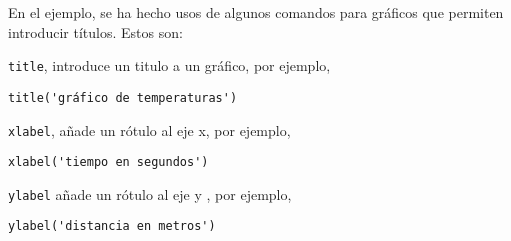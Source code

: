 










En el ejemplo, se ha hecho usos de algunos comandos para gráficos que permiten introducir títulos. Estos son: 

\texttt{title}, introduce un titulo a un gráfico, por ejemplo,
\begin{verbatim}
title('gráfico de temperaturas')
\end{verbatim}

\texttt{xlabel}, añade un rótulo al eje x, por ejemplo,

\begin{verbatim}
xlabel('tiempo en segundos')
\end{verbatim}

\texttt{ylabel} añade un rótulo al eje y , por ejemplo,
\begin{verbatim}
ylabel('distancia en metros')
\end{verbatim}

